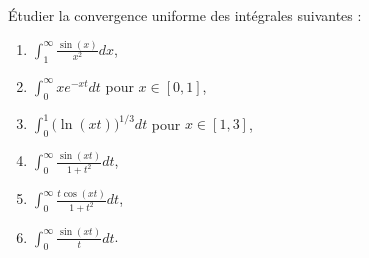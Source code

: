 

\begin{exercice}\label{exo_I-3-4}

Étudier la convergence uniforme des intégrales suivantes :
\begin{enumerate}
\item $\int_1^{\infty}\frac{ \sin(x) }{ x^2 }dx$,
\item $\int_0^{\infty}x e^{-xt}dt$ pour $x\in[0,1]$,
\item $\int_0^1\big( \ln(xt) \big)^{1/3}dt$ pour $x\in[1,3]$,
\item $\int_0^{\infty}\frac{ \sin(xt) }{ 1+t^2 }dt$,
\item $\int_0^{\infty}\frac{ t\cos(xt) }{ 1+t^2 }dt$,
\item $\int_0^{\infty}\frac{ \sin(xt) }{ t }dt$.
\end{enumerate}

\end{exercice}
